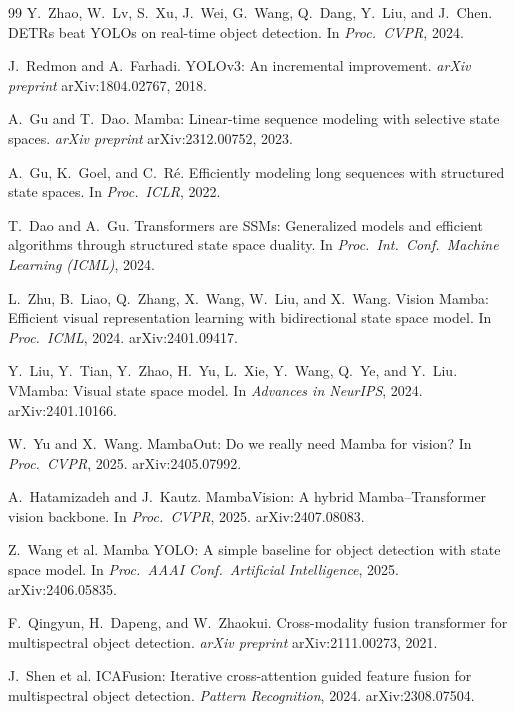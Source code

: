 \begin{thebibliography}{99}
Y.~Zhao, W.~Lv, S.~Xu, J.~Wei, G.~Wang, Q.~Dang, Y.~Liu, and J.~Chen.
DETRs beat YOLOs on real-time object detection.
In \textit{Proc.\ CVPR}, 2024.

J.~Redmon and A.~Farhadi.
YOLOv3: An incremental improvement.
\textit{arXiv preprint} arXiv:1804.02767, 2018.

A.~Gu and T.~Dao.
Mamba: Linear-time sequence modeling with selective state spaces.
\textit{arXiv preprint} arXiv:2312.00752, 2023.

A.~Gu, K.~Goel, and C.~R\'e.
Efficiently modeling long sequences with structured state spaces.
In \textit{Proc.\ ICLR}, 2022.

T.~Dao and A.~Gu.
Transformers are SSMs: Generalized models and efficient algorithms through
structured state space duality.
In \textit{Proc.\ Int.\ Conf.\ Machine Learning (ICML)}, 2024.

L.~Zhu, B.~Liao, Q.~Zhang, X.~Wang, W.~Liu, and X.~Wang.
Vision Mamba: Efficient visual representation learning with bidirectional
state space model. In \textit{Proc.\ ICML}, 2024. arXiv:2401.09417.

Y.~Liu, Y.~Tian, Y.~Zhao, H.~Yu, L.~Xie, Y.~Wang, Q.~Ye, and Y.~Liu.
VMamba: Visual state space model.
In \textit{Advances in NeurIPS}, 2024. arXiv:2401.10166.

W.~Yu and X.~Wang.
MambaOut: Do we really need Mamba for vision?
In \textit{Proc.\ CVPR}, 2025. arXiv:2405.07992.

A.~Hatamizadeh and J.~Kautz.
MambaVision: A hybrid Mamba--Transformer vision backbone.
In \textit{Proc.\ CVPR}, 2025. arXiv:2407.08083.

Z.~Wang et al.
Mamba YOLO: A simple baseline for object detection with state space model.
In \textit{Proc.\ AAAI Conf.\ Artificial Intelligence}, 2025. arXiv:2406.05835.

F.~Qingyun, H.~Dapeng, and W.~Zhaokui.
Cross-modality fusion transformer for multispectral object detection.
\textit{arXiv preprint} arXiv:2111.00273, 2021.

J.~Shen et al.
ICAFusion: Iterative cross-attention guided feature fusion for multispectral
object detection. \textit{Pattern Recognition}, 2024. arXiv:2308.07504.


\end{thebibliography}
